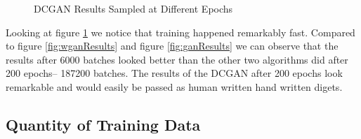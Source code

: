\documentclass[12pt,
 reprint,
nofootinbib,
 amsmath,amssymb,
 aps,
floatfix,
]{revtex4-2}
\begin{document}
\begin{figure}[h!]
    \centering
    \qquad
    \qquad
    \caption{DCGAN Results Sampled at Different Epochs}%
    \label{fig:dcganResults}%
\end{figure}

Looking at figure \ref{fig:dcganResults} we notice that training happened remarkably fast. Compared to figure \ref{fig:wganResults} and figure \ref{fig:ganResults} we can observe that the results after 6000 batches looked better than the other two algorithms did after 200 epochs-- 187200 batches. The results of the DCGAN after 200 epochs look remarkable and would easily be passed as human written hand written digets. 

\subsection{\label{sec:expData}Quantity of Training Data}
\end{document}
